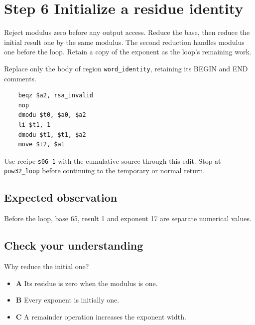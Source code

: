 \section{Step 6 Initialize a residue identity}\label{rsa-s06}

Reject modulus zero before any output access. Reduce the base, then reduce the initial result one by the same modulus. The second reduction handles modulus one before the loop. Retain a copy of the exponent as the loop's remaining work.

Replace only the body of region \texttt{word\_identity}, retaining its BEGIN and END comments.

\begin{verbatim}
    beqz $a2, rsa_invalid
    nop
    dmodu $t0, $a0, $a2
    li $t1, 1
    dmodu $t1, $t1, $a2
    move $t2, $a1
\end{verbatim}

Use recipe \texttt{s06-1} with the cumulative source through this edit. Stop at \texttt{pow32\_loop} before continuing to the temporary or normal return.

\subsection{Expected observation}
Before the loop, base 65, result 1 and exponent 17 are separate numerical values.

\subsection{Check your understanding}
Why reduce the initial one?

\begin{itemize}
  \item \textbf{A} Its residue is zero when the modulus is one.
  \item \textbf{B} Every exponent is initially one.
  \item \textbf{C} A remainder operation increases the exponent width.
\end{itemize}
